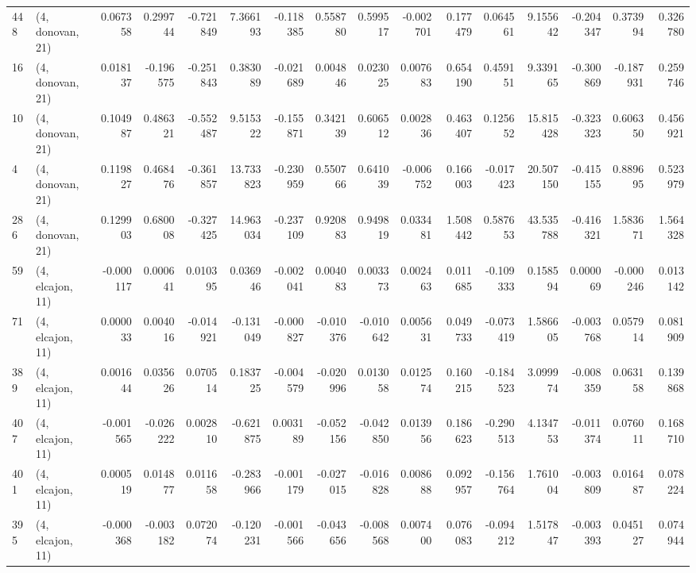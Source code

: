 \begin{tabular}{llrrrrrrrrrrrrrr}
448 &  (4, donovan, 21) &   0.067358 &  0.299744 & -0.721849 &   7.366193 & -0.118385 &   0.558780 &  0.599517 & -0.002701 &  0.177479 &  0.064561 &     9.155642 &  -0.204347 &   0.373994 &   0.326780 \\
16  &  (4, donovan, 21) &   0.018137 & -0.196575 & -0.251843 &   0.383089 & -0.021689 &   0.004846 &  0.023025 &  0.007683 &  0.654190 &  0.459151 &     9.339165 &  -0.300869 &  -0.187931 &   0.259746 \\
10  &  (4, donovan, 21) &   0.104987 &  0.486321 & -0.552487 &   9.515322 & -0.155871 &   0.342139 &  0.606512 &  0.002836 &  0.463407 &  0.125652 &    15.815428 &  -0.323323 &   0.606350 &   0.456921 \\
4   &  (4, donovan, 21) &   0.119827 &  0.468476 & -0.361857 &  13.733823 & -0.230959 &   0.550766 &  0.641039 & -0.006752 &  0.166003 & -0.017423 &    20.507150 &  -0.415155 &   0.889695 &   0.523979 \\
286 &  (4, donovan, 21) &   0.129903 &  0.680008 & -0.327425 &  14.963034 & -0.237109 &   0.920883 &  0.949819 &  0.033481 &  1.508442 &  0.587653 &    43.535788 &  -0.416321 &   1.583671 &   1.564328 \\
59  &  (4, elcajon, 11) &  -0.000117 &  0.000641 &  0.010395 &   0.036946 & -0.002041 &   0.004083 &  0.003373 &  0.002463 &  0.011685 & -0.109333 &     0.158594 &   0.000069 &  -0.000246 &   0.013142 \\
71  &  (4, elcajon, 11) &   0.000033 &  0.004016 & -0.014921 &  -0.131049 & -0.000827 &  -0.010376 & -0.010642 &  0.005631 &  0.049733 & -0.073419 &     1.586605 &  -0.003768 &   0.057914 &   0.081909 \\
389 &  (4, elcajon, 11) &   0.001644 &  0.035626 &  0.070514 &   0.183725 & -0.004579 &  -0.020996 &  0.013058 &  0.012574 &  0.160215 & -0.184523 &     3.099974 &  -0.008359 &   0.063158 &   0.139868 \\
407 &  (4, elcajon, 11) &  -0.001565 & -0.026222 &  0.002810 &  -0.621875 &  0.003189 &  -0.052156 & -0.042850 &  0.013956 &  0.186623 & -0.290513 &     4.134753 &  -0.011374 &   0.076011 &   0.168710 \\
401 &  (4, elcajon, 11) &   0.000519 &  0.014877 &  0.011658 &  -0.283966 & -0.001179 &  -0.027015 & -0.016828 &  0.008688 &  0.092957 & -0.156764 &     1.761004 &  -0.003809 &   0.016487 &   0.078224 \\
395 &  (4, elcajon, 11) &  -0.000368 & -0.003182 &  0.072074 &  -0.120231 & -0.001566 &  -0.043656 & -0.008568 &  0.007400 &  0.076083 & -0.094212 &     1.517847 &  -0.003393 &   0.045127 &   0.074944 \\

\end{tabular}
